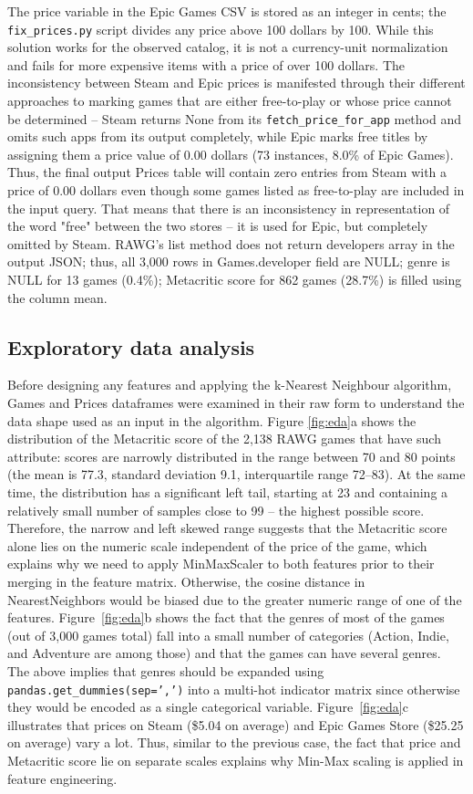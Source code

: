 \documentclass[fleqn,10pt]{wlscirep}
\begin{document}
The price variable in the Epic Games CSV is stored as an integer in cents; the \texttt{fix\_prices.py} script divides any price above 100 dollars by 100. While this solution works for the observed catalog, it is not a currency-unit normalization and fails for more expensive items with a price of over 100 dollars. The inconsistency between Steam and Epic prices is manifested through their different approaches to marking games that are either free-to-play or whose price cannot be determined – Steam returns None from its \texttt{fetch\_price\_for\_app} method and omits such apps from its output completely, while Epic marks free titles by assigning them a price value of 0.00 dollars (73 instances, 8.0\% of Epic Games). Thus, the final output Prices table will contain zero entries from Steam with a price of 0.00 dollars even though some games listed as free-to-play are included in the input query. That means that there is an inconsistency in representation of the word "free" between the two stores – it is used for Epic, but completely omitted by Steam. RAWG's list method does not return developers array in the output JSON; thus, all 3,000 rows in Games.developer field are NULL; genre is NULL for 13 games (0.4\%); Metacritic score for 862 games (28.7\%) is filled using the column mean.

\subsection*{Exploratory data analysis}

Before designing any features and applying the k-Nearest Neighbour algorithm, Games and Prices dataframes were examined in their raw form to understand the data shape used as an input in the algorithm. Figure \ref{fig:eda}a  shows the distribution of the Metacritic score of the 2,138 RAWG games that have such attribute: scores are narrowly distributed in the range between 70 and 80 points (the mean is 77.3, standard deviation 9.1, interquartile range 72–83). At the same time, the distribution has a significant left tail, starting at 23 and containing a relatively small number of samples close to 99 – the highest possible score. Therefore, the narrow and left skewed range suggests that the Metacritic score alone lies on the numeric scale independent of the price of the game, which explains why we need to apply MinMaxScaler to both features prior to their merging in the feature matrix. Otherwise, the cosine distance in NearestNeighbors would be biased due to the greater numeric range of one of the features. Figure~\ref{fig:eda}b shows the fact that the genres of most of the games (out of 3,000 games total) fall into a small number of categories (Action, Indie, and Adventure are among those) and that the games can have several genres. The above implies that genres should be expanded using \texttt{pandas.get\_dummies(sep=',')} into a multi-hot indicator matrix since otherwise they would be encoded as a single categorical variable. Figure~\ref{fig:eda}c illustrates that prices on Steam (\$5.04 on average) and Epic Games Store (\$25.25 on average) vary a lot. Thus, similar to the previous case, the fact that price and Metacritic score lie on separate scales explains why Min-Max scaling is applied in feature engineering.
\end{document}
